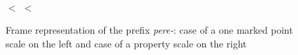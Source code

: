 \begin{figure}[H]\small
\begin{minipage}{0.5\textwidth}
\\
\centering
{} $<$  $<$ 
 \end{minipage}\hfill%
 \begin{minipage}{0.45\textwidth}
 \end{minipage}
\caption{Frame representation of the prefix \textit{pere-}: case of a one marked point scale on the left and case of a property scale on the right \label{app:pere:iter}}
\end{figure}

